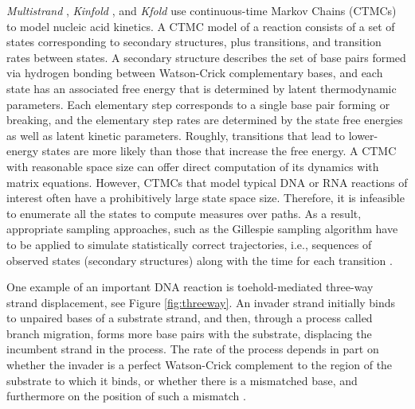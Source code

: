 \documentclass{article}
\begin{document}
\textit{Multistrand} \cite{Schaeffer,multistrandpaper}, \textit{Kinfold} \cite{Kinfold}, and \textit{Kfold} \cite{Kfold} use continuous-time Markov Chains (CTMCs) to model nucleic acid kinetics. A CTMC model of a reaction consists of a set of states corresponding to secondary structures, plus transitions, and transition rates between states. A secondary structure describes the set of base pairs formed via hydrogen bonding between Watson-Crick complementary bases, and each state has an associated free energy that is determined by latent thermodynamic parameters. Each elementary step corresponds to a single base pair forming or breaking, and the elementary step rates are determined by the state free energies as well as latent kinetic parameters. Roughly, transitions that lead to lower-energy states are more likely than those that increase the free energy. A CTMC with reasonable space size can offer direct computation of its dynamics with matrix equations. However, CTMCs that model typical DNA or RNA reactions of interest often have a prohibitively large state space size. Therefore, it is infeasible to enumerate all the states to compute measures over paths. As a result, appropriate sampling approaches, such as the Gillespie sampling algorithm \cite{Gillespie} have to be applied to simulate statistically correct trajectories, i.e., sequences of observed states (secondary structures) along with the time for each transition \cite{Schaeffer}.

One example of an important DNA reaction is toehold-mediated three-way strand displacement, see Figure \ref{fig:threeway}. An invader strand initially binds to unpaired bases of a substrate strand, and then, through a process called branch migration, forms more base pairs with the substrate, displacing the incumbent strand in the process. The rate of the process depends in part on whether the invader is a perfect Watson-Crick complement to the region of the substrate to which it binds, or whether there is a mismatched base, and furthermore on the position of such a mismatch \cite{MachinekThreeway}.
\end{document}
